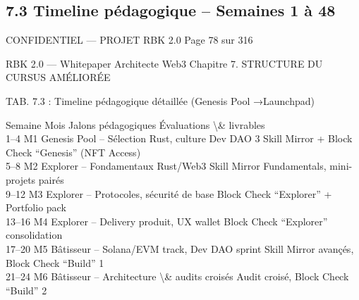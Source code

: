 \documentclass[12pt,landscape,a4paper]{article}
\newenvironment{confidential}
{\begin{tcolorbox}[
    colback=rbkred!5!white,
    colframe=rbkred!75!black,
    title=CONFIDENTIEL,
    fonttitle=\bfseries\color{white},
    coltitle=rbkred!75!black,
    breakable,
    enhanced,
    frame hidden,
    borderline west={2pt}{0pt}{rbkred!75!black}
]}
{\end{tcolorbox}}
\begin{document}
\subsection{7.3 Timeline pédagogique – Semaines 1 à 48}
\vspace{0.5em}
\vspace{0.5em}
\vspace{0.5em}
\vspace{0.5em}
\begin{confidential}CONFIDENTIEL — PROJET RBK 2.0                                         Page 78 sur 316\end{confidential}
RBK 2.0 — Whitepaper Architecte Web3                                                          Chapitre 7. STRUCTURE DU CURSUS AMÉLIORÉE\\
\vspace{0.5em}
\vspace{0.5em}
\vspace{0.5em}
\vspace{0.5em}
\begin{center}\begin{tabular}TAB. 7.3 : Timeline pédagogique détaillée (Genesis Pool →Launchpad)\end{tabular}\end{center}
\vspace{0.5em}
\vspace{0.5em}
Semaine      Mois     Jalons pédagogiques                                  Évaluations \textbackslash{}& livrables\\
1–4        M1       Genesis Pool – Sélection Rust, culture Dev DAO       3 Skill Mirror + Block Check “Genesis” (NFT Access)\\
5–8        M2       Explorer – Fondamentaux Rust/Web3                    Skill Mirror Fundamentals, mini-projets pairés\\
9–12       M3       Explorer – Protocoles, sécurité de base              Block Check “Explorer” + Portfolio pack\\
13–16       M4       Explorer – Delivery produit, UX wallet               Block Check “Explorer” consolidation\\
17–20       M5       Bâtisseur – Solana/EVM track, Dev DAO sprint         Skill Mirror avançés, Block Check “Build” 1\\
21–24       M6       Bâtisseur – Architecture \textbackslash{}& audits croisés            Audit croisé, Block Check “Build” 2\\
\vspace{0.5em}
\end{document}
